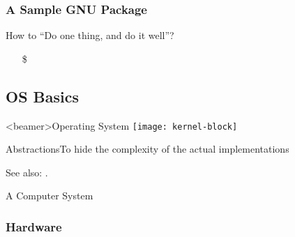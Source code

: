 \subsubsection{A Sample GNU Package}
\label{sec:sample-gnu-package}

\begin{frame}{How to ``Do one thing, and do it well''?}  
  \begin{itemize}
  \item[\$] 
  \end{itemize}
\end{frame}

\subsection{OS Basics}
\label{sec:os-basics}

\begin{frame}<beamer>{Operating System}
  \centering
  \texttt{[image: kernel-block]}
\end{frame}

\begin{frame}{Abstractions}{To hide the complexity of the actual implementations}
  \begin{center}
  \end{center}
\end{frame}

See also: .

\begin{frame}{A Computer System}
  \begin{center}
  \end{center}
\end{frame}

\subsubsection{Hardware}
\label{sec:cpu}

